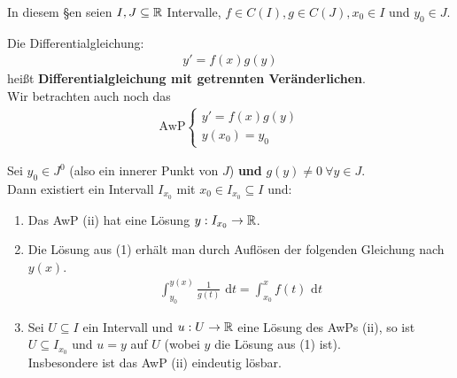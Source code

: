 \documentclass[a4paper,oneside,DIV15,BCOR12mm,chapterprefix=true,headings=onelinechapter]{scrbook}
\begin{document}
In diesem §en seien $I,J\subseteq\mathbb{R}$ Intervalle, $f\in C(I),g\in C(J),x_0\in I$ und
$y_0\in J$.

\begin{definition}
Die Differentialgleichung:
\begin{align*}
y'=f(x)g(y)\tag{i}
\end{align*}
heißt \textbf{Differentialgleichung mit getrennten Veränderlichen}.\\
Wir betrachten auch noch das
\begin{align*}
\text{AwP}
\begin{cases}
y'=f(x)g(y)\\
y(x_0)=y_0
\end{cases}
\tag{ii}
\end{align*}
\end{definition}

\begin{satz}[Lösungen]
Sei $y_0\in J^0$ (also ein innerer Punkt von $J$) \textbf{und} $g(y)\ne 0\ \forall y\in J$.\\
Dann existiert ein Intervall $I_{x_0}$ mit $x_0\in I_{x_0}\subseteq I$ und:
\begin{enumerate}
\item Das AwP (ii) hat eine Lösung $y:I_{x_0}\to\mathbb{R}$.
\item Die Lösung aus (1) erhält man durch Auflösen der folgenden Gleichung nach $y(x)$.
\begin{align*}
\int_{y_0}^{y(x)}\frac 1{g(t)}\text{ d}t=\int_{x_0}^x f(t)\text{ d}t\tag{$*$}
\end{align*}
\item Sei $U\subseteq I$ ein Intervall und $u:U\to\mathbb{R}$ eine Lösung des AwPs (ii),
so ist $U\subseteq I_{x_0}$ und $u=y$ auf $U$ (wobei $y$ die Lösung aus (1) ist).\\
Insbesondere ist das AwP (ii) eindeutig lösbar.
\end{enumerate}
\end{satz}
\end{document}
